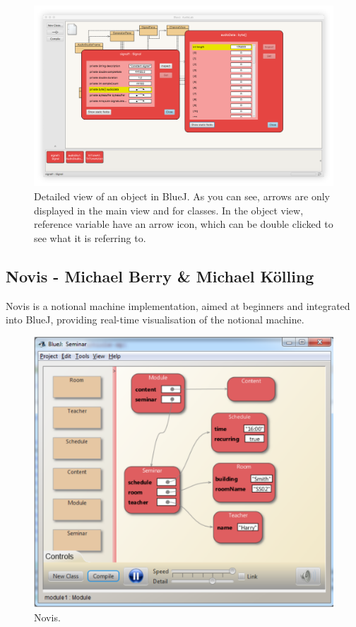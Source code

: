 \documentclass[]{usiinfbachelorproject}
\begin{document}
\begin{figure}[h]
\centering
\includegraphics[width=\textwidth]{figures/bluej_objects_open.png}
\caption {Detailed view of an object in BlueJ. As you can see, arrows are only displayed in the main view and for classes. In the object view, reference variable have an arrow icon, which can be double clicked to see what it is referring to.}
\label {bluej_objects_open}
\end{figure}

\subsection{Novis - Michael Berry \& Michael K\"{o}lling}

Novis \cite{7743153} is a notional machine implementation, aimed at beginners and integrated into BlueJ, providing real-time visualisation of the notional machine.

\begin{figure}[h]
\centering
\includegraphics[scale=0.4]{figures/Novis.png}
\caption {Novis.}
\end{figure}
\end{document}
